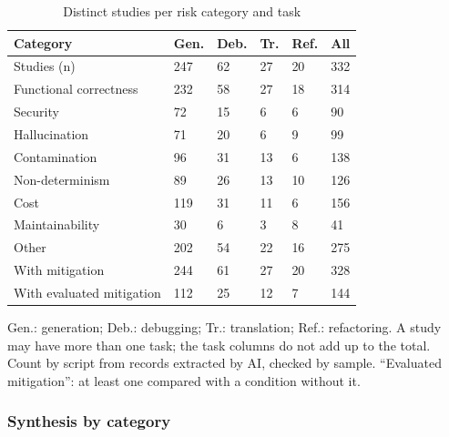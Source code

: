 \begin{table}[!t]
\centering
\footnotesize
\setlength{\tabcolsep}{3pt}
\caption{Distinct studies per risk category and task}
\label{tab:riscos}
\begin{tabular}{p{2.6cm}p{0.75cm}p{0.75cm}p{0.75cm}p{0.75cm}p{0.75cm}}
\hline
Category & Gen. & Deb. & Tr. & Ref. & All \\
\hline
Studies (n) & 247 & 62 & 27 & 20 & 332 \\
\hline
Functional correctness & 232 & 58 & 27 & 18 & 314 \\
Security & 72 & 15 & 6 & 6 & 90 \\
Hallucination & 71 & 20 & 6 & 9 & 99 \\
Contamination & 96 & 31 & 13 & 6 & 138 \\
Non-determinism & 89 & 26 & 13 & 10 & 126 \\
Cost & 119 & 31 & 11 & 6 & 156 \\
Maintainability & 30 & 6 & 3 & 8 & 41 \\
Other & 202 & 54 & 22 & 16 & 275 \\
\hline
With mitigation & 244 & 61 & 27 & 20 & 328 \\
With evaluated mitigation & 112 & 25 & 12 & 7 & 144 \\
\hline
\end{tabular}
\par\smallskip
\parbox{\columnwidth}{\scriptsize Gen.: generation; Deb.: debugging; Tr.: translation; Ref.: refactoring. A study may have more than one task; the task columns do not add up to the total. Count by script from records extracted by AI, checked by sample. ``Evaluated mitigation'': at least one compared with a condition without it.}
\end{table}

\subsubsection{Synthesis by category}

